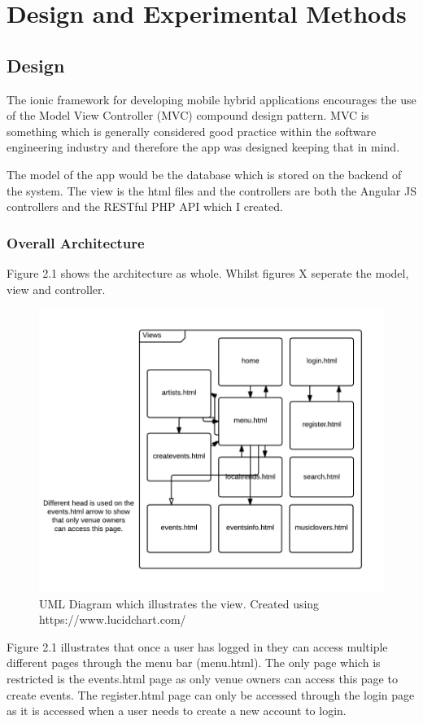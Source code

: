 \chapter{Design and Experimental Methods}
\section{Design}
The ionic framework for developing mobile hybrid applications encourages the use of the Model View Controller (MVC) compound design pattern. MVC is something which is generally considered good practice within the software engineering industry and therefore the app was designed keeping that in mind.

The model of the app would be the database which is stored on the backend of the system. The view is the html files and the controllers are both the Angular JS controllers and the RESTful PHP API which I created.

\subsection{Overall Architecture}
Figure 2.1 shows the architecture as whole. Whilst figures X seperate the model, view and controller.
\begin{figure}[H]
\includegraphics[width=\textwidth,height=\textheight,keepaspectratio]{images/va}
\caption{UML Diagram which illustrates the view. Created using https://www.lucidchart.com/}
\end{figure}
Figure 2.1 illustrates that once a user has logged in they can access multiple different pages through the menu bar (menu.html). The only page which is restricted is the events.html page as only venue owners can access this page to create events. The register.html page can only be accessed through the login page as it is accessed when a user needs to create a new account to login.

